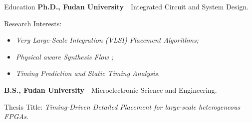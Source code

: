 
\begin{rubric}{Education}
	\textbf{Ph.D., Fudan University}~~Integrated Circuit and System Design.
	\par Research Interests:
	\begin{itemize}
		\setlength{\itemsep}{-3pt}
		\item \emph{Very Large-Scale Integration (VLSI) Placement Algorithms;}
		\item \emph{Physical aware Synthesis Flow ;}
		\item \emph{Timing Prediction and Static Timing Analysis.}
	\end{itemize}

	\textbf{B.S., Fudan University}~~Microelectronic Science and Engineering.
	\par
	Thesis Title: \emph{Timing-Driven Detailed Placement for large-scale heterogeneous FPGAs}.
\end{rubric}
